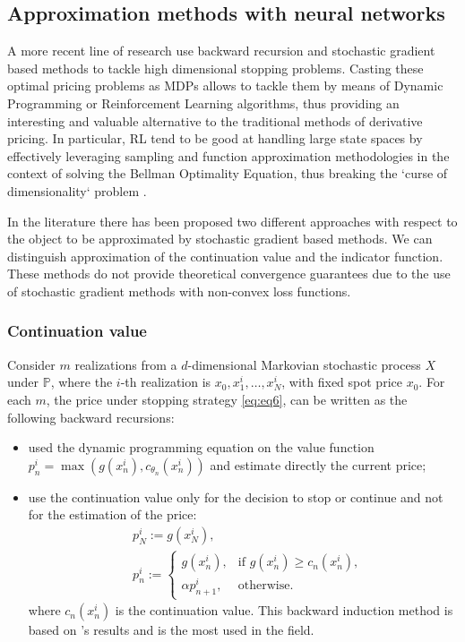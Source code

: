 \documentclass{article}
\begin{document}
\subsection{Approximation methods with neural networks}
A more recent line of research use backward recursion and stochastic gradient based methods to tackle high dimensional stopping problems. Casting these optimal pricing problems as MDPs allows to tackle them by means of Dynamic Programming or Reinforcement Learning algorithms, thus providing an interesting and valuable alternative to the traditional methods of derivative pricing. In particular, RL tend to be good at handling large state spaces by effectively leveraging sampling and function approximation methodologies in the context of solving the Bellman Optimality Equation, thus breaking the `curse of dimensionality` problem \citep{foundationsRL}. 

In the literature there has been proposed two different approaches with respect to the object to be approximated by stochastic gradient based methods. We can distinguish approximation of the continuation value and the indicator function. These methods do not provide theoretical convergence guarantees due to the use of stochastic gradient methods with non-convex loss functions. 

\subsubsection*{Continuation value}
Consider $m$ realizations from a $d$-dimensional Markovian stochastic process $X$ under $\mathbb{P}$, where the $i$-th realization is $x_0, x_1^i, \ldots, x_N^i$, with fixed spot price $x_0$. For each $m$, the price under stopping strategy \ref{eq:eq6}, can be written as the following backward recursions:
\begin{itemize}
    \item \cite{tsitsiklis2001regression} used the dynamic programming equation on the value function $p_n^i = \max(g(x_n^i), c_{\theta_n}(x^i_n))$ and estimate directly the current price;
    \item \cite{longstaff2001valuing} use the continuation value only for the decision to stop or continue and not for the estimation of the price:
    \begin{equation}\label{eq7}
           \begin{split}
               &p_N^i := g(x^i_N),\\
               &p_n^i := \begin{cases} 
           g(x^i_n), & \mbox{if } g(x^i_n) \geq c_n(x^i_n), \\ 
              \alpha p^i_{n+1}, & \mbox{otherwise.}  \end{cases}
           \end{split}   
    \end{equation}
    where $c_n(x_n^i)$ is the continuation value. This backward induction method is based on \cite{longstaff2001valuing}'s results and is the most used in the field. 
\end{itemize}
\end{document}
